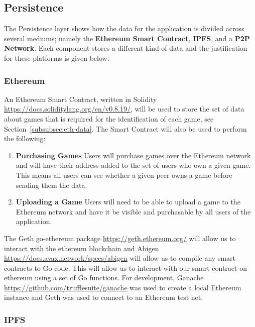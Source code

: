 
\subsection{Persistence}

The Persistence layer shows how the data for the application is divided across several mediums; namely the \textbf{Ethereum Smart Contract}, \textbf{IPFS}, and a \textbf{P2P Network}. Each component stores a different kind of data and the justification for these platforms is given below.

\subsubsection*{Ethereum}\label{subsubsec:impl-eth}

An Ethereum Smart Contract, written in Solidity \url{https://docs.soliditylang.org/en/v0.8.19/}, will be used to store the set of data about games that is required for the identification of each game, see Section~\ref{subsubsec:eth-data}. The Smart Contract will also be used to perform the following:

\begin{enumerate}
  \item \textbf{Purchasing Games} Users will purchase games over the Ethereum network and will have their address added to the set of users who own a given game. This means all users can see whether a given peer owns a game before sending them the data.
  \item \textbf{Uploading a Game} Users will need to be able to upload a game to the Ethereum network and have it be visible and purchasable by all users of the application.
\end{enumerate}

\vspace{2mm}\noindent
The Geth go-ethereum package \url{https://geth.ethereum.org/} will allow us to interact with the ethereum blockchain and Abigen \url{https://docs.avax.network/specs/abigen} will allow us to compile any smart contracts to Go code. This will allow us to interact with our smart contract on ethereum using a set of Go functions. For development, Ganache \url{https://github.com/trufflesuite/ganache} was used to create a local Ethereum instance and Geth was used to connect to an Ethereum test net.


\subsubsection*{IPFS}


